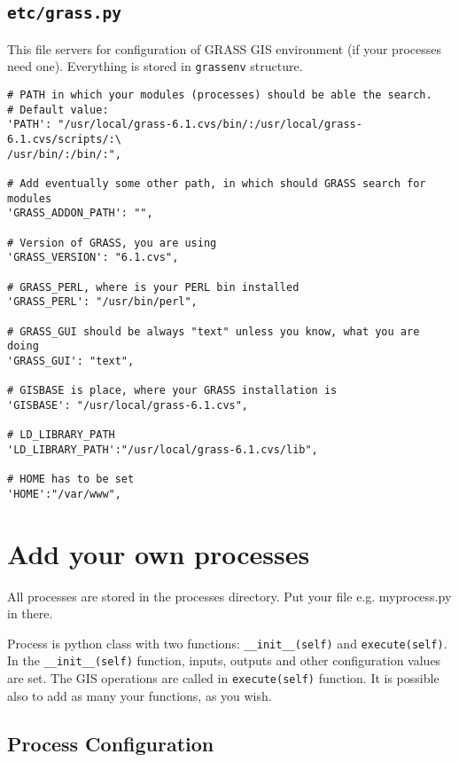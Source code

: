 \documentclass[a4paper,11pt]{article}
\begin{document}
    \subsection{\texttt{etc/grass.py}}
     
    This file servers for configuration of GRASS GIS environment (if your
    processes need one). Everything is stored in \texttt{grassenv} structure. 
     

    \begin{verbatim}
# PATH in which your modules (processes) should be able the search.
# Default value:
'PATH': "/usr/local/grass-6.1.cvs/bin/:/usr/local/grass-6.1.cvs/scripts/:\
/usr/bin/:/bin/:",

# Add eventually some other path, in which should GRASS search for modules
'GRASS_ADDON_PATH': "",

# Version of GRASS, you are using
'GRASS_VERSION': "6.1.cvs",

# GRASS_PERL, where is your PERL bin installed
'GRASS_PERL': "/usr/bin/perl",

# GRASS_GUI should be always "text" unless you know, what you are doing
'GRASS_GUI': "text",

# GISBASE is place, where your GRASS installation is
'GISBASE': "/usr/local/grass-6.1.cvs",

# LD_LIBRARY_PATH
'LD_LIBRARY_PATH':"/usr/local/grass-6.1.cvs/lib",

# HOME has to be set
'HOME':"/var/www",
    \end{verbatim}

    
    \section{Add your own processes}
     
    All processes are stored in the processes directory. Put your file
    e.g. myprocess.py in there.
     

     
    Process is python class with two functions: \texttt{\_\_init\_\_(self)}
    and \texttt{execute(self)}.
    In the \texttt{\_\_init\_\_(self)} function, inputs, outputs and other configuration values are set. The GIS operations 
    are called in \texttt{execute(self)}  function. It is possible also to add as many your functions, as you wish.
     

    \subsection{Process Configuration}
     
\end{document}
